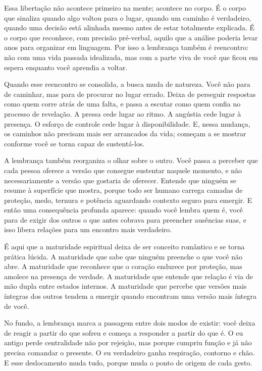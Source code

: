 \documentclass[12pt]{book}
\begin{document}
Essa libertação não acontece primeiro na mente; acontece no corpo. É o corpo que sinaliza quando algo voltou para o lugar, quando um caminho é verdadeiro, quando uma decisão está alinhada mesmo antes de estar totalmente explicada. É o corpo que reconhece, com precisão pré-verbal, aquilo que a análise poderia levar anos para organizar em linguagem. Por isso a lembrança também é reencontro: não com uma vida passada idealizada, mas com a parte viva de você que ficou em espera enquanto você aprendia a voltar.

Quando esse reencontro se consolida, a busca muda de natureza. Você não para de caminhar, mas para de procurar no lugar errado. Deixa de perseguir respostas como quem corre atrás de uma falta, e passa a escutar como quem confia no processo de revelação. A pressa cede lugar ao ritmo. A angústia cede lugar à presença. O esforço de controle cede lugar à disponibilidade. E, nessa mudança, os caminhos não precisam mais ser arrancados da vida; começam a se mostrar conforme você se torna capaz de sustentá-los.

A lembrança também reorganiza o olhar sobre o outro. Você passa a perceber que cada pessoa oferece a versão que consegue sustentar naquele momento, e não necessariamente a versão que gostaria de oferecer. Entende que ninguém se resume à superfície que mostra, porque todo ser humano carrega camadas de proteção, medo, ternura e potência aguardando contexto seguro para emergir. E então uma consequência profunda aparece: quando você lembra quem é, você para de exigir dos outros o que antes cobrava para preencher ausências suas, e isso libera relações para um encontro mais verdadeiro.

É aqui que a maturidade espiritual deixa de ser conceito romântico e se torna prática lúcida. A maturidade que sabe que ninguém preenche o que você não abre. A maturidade que reconhece que o coração endurece por proteção, mas amolece na presença de verdade. A maturidade que entende que relação é via de mão dupla entre estados internos. A maturidade que percebe que versões mais íntegras dos outros tendem a emergir quando encontram uma versão mais íntegra de você.

No fundo, a lembrança marca a passagem entre dois modos de existir: você deixa de reagir a partir do que sofreu e começa a responder a partir do que é. O eu antigo perde centralidade não por rejeição, mas porque cumpriu função e já não precisa comandar o presente. O eu verdadeiro ganha respiração, contorno e chão. E esse deslocamento muda tudo, porque muda o ponto de origem de cada gesto.
\end{document}
